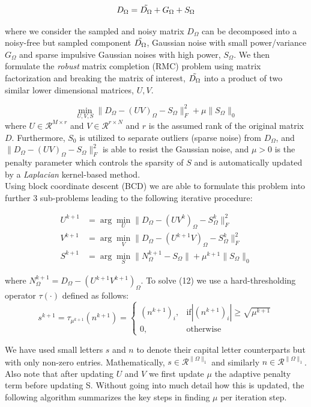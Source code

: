 $$D_{\Omega} = \Tilde{D_{\Omega}} + G_{\Omega} + S_{\Omega}$$

where we consider the sampled and noisy matrix $D_{\Omega}$ can be decomposed into a noisy-free but sampled component $\Tilde{D_{\Omega}}$, Gaussian noise with small power/variance $G_{\Omega}$ and sparse impulsive Gaussian noises with high power, $S_{\Omega}$. We then formulate the \textit{robust} matrix completion (RMC) problem using matrix factorization and breaking the matrix of interest, $\Tilde{D_{\Omega}}$ into a product of two similar lower dimensional matrices, $U, V$.

\begin{equation}
\min_{U, V, S} \lVert D_{\Omega} - (UV)_{\Omega} - S_{\Omega} \rVert_F^{2} + \mu \lVert S_{\Omega} \rVert_0
\label{eq19}
\end{equation}
where $U \in \mathcal{R}^{M \times r}$ and $V \in \mathcal{R}^{r \times N}$
 and $r$ is the assumed rank of the original matrix $D$. 
Furthermore,  $S_0$ is utilized to separate outliers (sparse noise) from $D_{\Omega}$, and $\lVert D_{\Omega} - (UV)_{\Omega} - S_{\Omega} \rVert_F^{2}$ is able to resist the Gaussian noise, and $\mu > 0$ is the penalty parameter which controls the sparsity of $S$ and is automatically updated by a \textit{Laplacian} kernel-based method. \\ 

Using block coordinate descent (BCD) we are able to formulate this problem into further 3 sub-problems leading to the following iterative procedure: 

\begin{align}
U^{k+1} & = \arg \min_U \lVert D_{\Omega} - (UV^k)_{\Omega}  - S^{k}_{\Omega} \rVert_F^2 \\
V^{k+1} & = \arg \min_V \lVert D_{\Omega} - (U^{k+1}V)_{\Omega} - S^{k}_{\Omega} \rVert_F^2 \\
S^{k+1} & = \arg \min_S \lVert N^{k+1}_{\Omega} - S_{\Omega} \rVert + \mu^{k+1} \|S_{\Omega}\|_{0}
\end{align}

where $N^{k+1}_{\Omega} = D_{\Omega} - (U^{k+1}V^{k+1})_{\Omega}$. To solve (12) we use a hard-thresholding operator ${\tau}(\cdot)$ defined as follows: $$s^{k+1} = \tau_{\mu^{k+1}}(n^{k+1}) = \begin{cases}
(n^{k+1})_{i}, & \text{if} |(n^{k+1})_{i}| \geq \sqrt{\mu^{k+1}} \\
0, & \text{otherwise}
\end{cases}$$

We have used small letters $s$ and $n$ to denote their capital letter counterparts but with only non-zero entries. Mathematically, $s \in \mathcal{R}^{\|\Omega\|_{1}}$ and similarly $n \in \mathcal{R}^{\|\Omega\|_{1}}$. \\ Also note that after updating $U$ and $V$ we first update $\mu$ the adaptive penalty term before updating S. Without going into much detail how this is updated, the following algorithm summarizes the key steps in finding $\mu$ per iteration step. 

